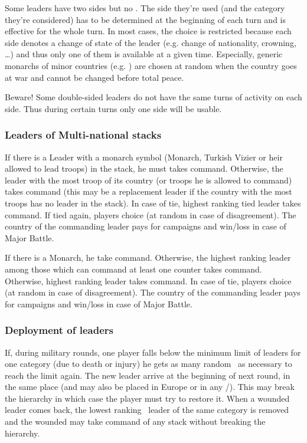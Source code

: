 \aparag Some leaders have two sides but no {\textetoile}.
\bparag The side they're used (and the category they're considered) has
to be determined at the beginning of each turn and is effective for the
whole turn.
\bparag In most cases, the choice is restricted because each side
denotes a change of state of the leader (e.g. change of nationality,
crowning, \ldots) and thus only one of them is available at a given
time.
\bparag Especially, generic monarchs of minor countries
(e.g. \leaderShah) are chosen at random when the country goes at war and
cannot be changed before total peace.

\aparag Beware! Some double-sided leaders do not have the same turns of
activity on each side. Thus during certain turns only one side will be
usable.

\subsubsection{Leaders of Multi-national stacks}\label{chMilitary:multi national}
\aparag[On land]
\bparag If there is a Leader with a monarch symbol (Monarch, Turkish Vizier or
heir allowed to lead troops) in the stack, he must takes command.
\bparag Otherwise, the leader with the most troop of its country (or troops he
is allowed to command) takes command (this may be a replacement leader if the
country with the most troops has no leader in the stack).
\bparag In case of tie, highest ranking tied leader takes command.
\bparag If tied again, players choice (at random in case of disagreement).
\bparag The country of the commanding leader pays for campaigns and win/loss
\STAB in case of Major Battle.

\aparag[At sea]
\bparag If there is a Monarch, he take command.
\bparag Otherwise, the highest ranking leader among those which can command at
least one \FLEET counter takes command.
\bparag Otherwise, highest ranking leader takes command.
\bparag In case of tie, players choice (at random in case of disagreement).
\bparag The country of the commanding leader pays for campaigns and win/loss
\STAB in case of Major Battle.

\subsubsection{Deployment of leaders}
\label{chMilitary:Leaders:Below limit}
\bparag If, during military rounds, one player falls below the minimum limit
of leaders for one category (due to death or injury) he gets as many random
\anonyme\ as necessary to reach the limit again.
\bparag The new leader arrive at the beginning of next round, in the same
place (\LeaderE and \LeaderC may also be placed in Europe or in any
\COL/\TP).
\bparag This may break the hierarchy in which case the player must try to
restore it.
\bparag When a wounded leader comes back, the lowest ranking \anonyme\ leader
of the same category is removed and the wounded may take command of any stack
without breaking the hierarchy.

